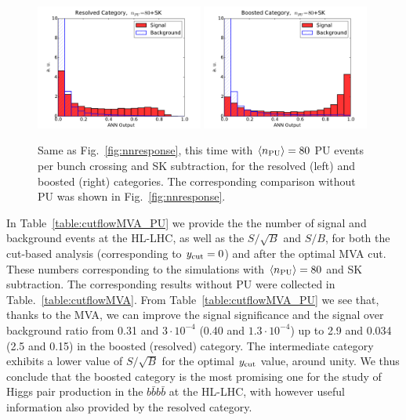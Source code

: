 \begin{figure}[t]
  \begin{center}
\includegraphics[width=0.49\textwidth]{plots/Resolved_disc_SKPU80.pdf}
\includegraphics[width=0.49\textwidth]{plots/Boosted_disc_SKPU80.pdf}
\caption{\small Same as Fig.~\ref{fig:nnresponse},
  this time with $\left\langle n_{\rm PU}\right\rangle=80$ PU events per bunch crossing
  and SK subtraction, for the resolved (left) and boosted
  (right) categories.
  The corresponding comparison without PU was shown in
  Fig.~\ref{fig:nnresponse}.
}
\label{fig:nnresponse_PU}
\end{center}
\end{figure}


In Table~\ref{table:cutflowMVA_PU}
we provide the  the number of signal and
    background events at the HL-LHC, as well as the $S/\sqrt{B}$ and $S/B$,
    for both the cut-based analysis (corresponding
    to $y_{\rm cut}=0$) and after the
    optimal MVA cut.
    These numbers corresponding to the simulations
    with $\left\langle n_{\rm PU}\right\rangle=80$
    and SK subtraction.
    The corresponding results without PU were collected
    in Table.~\ref{table:cutflowMVA}.
    From Table~\ref{table:cutflowMVA_PU} we see that, thanks
to the MVA, we can improve the signal significance and the
signal over background ratio from 0.31 and $3\cdot 10^{-4}$
(0.40 and $1.3\cdot 10^{-4}$) up to 2.9 and 0.034 (2.5 and 0.15)
in the boosted (resolved) category.
%
The intermediate category exhibits a lower value of $S/\sqrt{B}$
for the optimal $y_{\rm cut}$ value, around unity.
%
We thus conclude that the boosted category is the most promising
one for the study of Higgs pair production in the $b\bar{b}b\bar{b}$
at the HL-LHC, with however useful information also provided
by the resolved category.
 


